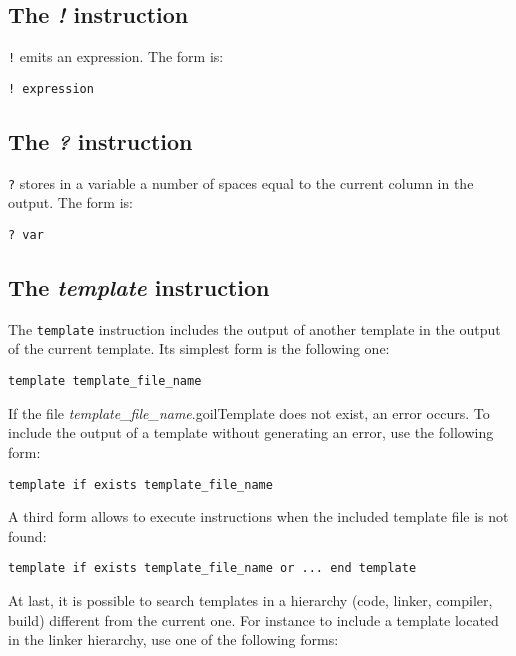 \subsection{The {\em !} instruction}
\label{outputInstruction}

{\tt !} emits an expression. The form is:

\begin{lstlisting}
! expression
\end{lstlisting}

\subsection{The {\em ?} instruction}

{\tt ?} stores in a variable a number of spaces equal to the current column in the output. The form is:

\begin{lstlisting}
? var
\end{lstlisting}

\subsection{The {\em template} instruction}

The {\tt template} instruction includes the output of another template in the output of the current template. Its simplest form is the following one:

\begin{lstlisting}
template template_file_name
\end{lstlisting}

If the file {\em template\_file\_name}.goilTemplate does not exist, an error occurs. To include the output of a template without generating an error, use the following form:

\begin{lstlisting}
template if exists template_file_name
\end{lstlisting}

A third form allows to execute instructions when the included template file is not found:

\begin{lstlisting}
template if exists template_file_name or ... end template
\end{lstlisting}

At last, it is possible to search templates in a hierarchy (code, linker, compiler, build) different from the current one. For instance to include a template located in the linker hierarchy, use one of the following forms:

